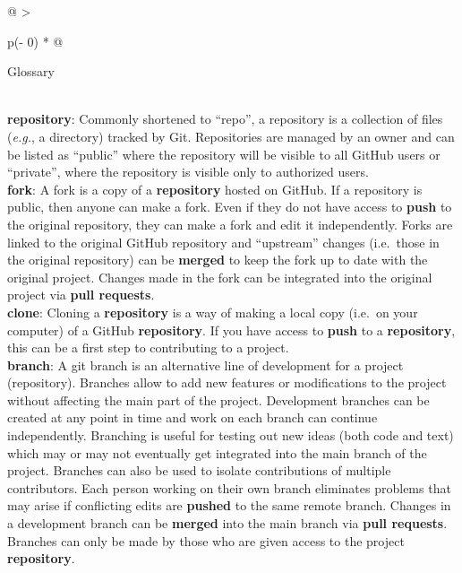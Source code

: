 \begin{tablenos:no-prefix-table-caption}

\begin{longtable}[]{@{}
  >{\raggedright\arraybackslash}p{(\columnwidth - 0\tabcolsep) * }@{}}
\toprule
\begin{minipage}[b]{\linewidth}\raggedright
Glossary
\end{minipage} \\
\midrule
\endhead
\textbf{repository}: Commonly shortened to ``repo'', a repository is a collection of files (\emph{e.g.}, a directory) tracked by Git. Repositories are managed by an owner and can be listed as ``public'' where the repository will be visible to all GitHub users or ``private'', where the repository is visible only to authorized users. \\
\textbf{fork}: A fork is a copy of a \textbf{repository} hosted on GitHub. If a repository is public, then anyone can make a fork. Even if they do not have access to \textbf{push} to the original repository, they can make a fork and edit it independently. Forks are linked to the original GitHub repository and ``upstream'' changes (i.e.~those in the original repository) can be \textbf{merged} to keep the fork up to date with the original project. Changes made in the fork can be integrated into the original project via \textbf{pull requests}. \\
\textbf{clone}: Cloning a \textbf{repository} is a way of making a local copy (i.e.~on your computer) of a GitHub \textbf{repository}. If you have access to \textbf{push} to a \textbf{repository}, this can be a first step to contributing to a project. \\
\textbf{branch}: A git branch is an alternative line of development for a project (repository). Branches allow to add new features or modifications to the project without affecting the main part of the project. Development branches can be created at any point in time and work on each branch can continue independently. Branching is useful for testing out new ideas (both code and text) which may or may not eventually get integrated into the main branch of the project. Branches can also be used to isolate contributions of multiple contributors. Each person working on their own branch eliminates problems that may arise if conflicting edits are \textbf{pushed} to the same remote branch. Changes in a development branch can be \textbf{merged} into the main branch via \textbf{pull requests}. Branches can only be made by those who are given access to the project \textbf{repository}. \\

\end{longtable}
\end{tablenos:no-prefix-table-caption}
